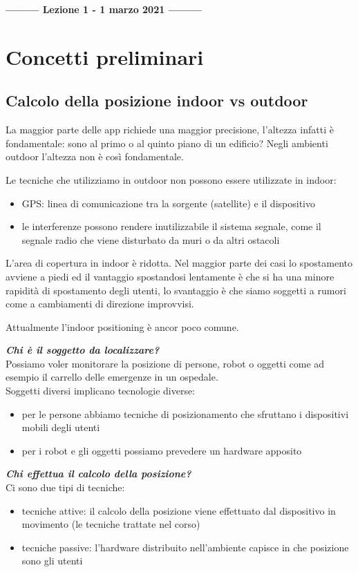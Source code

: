 \begin{center}
    \textbf{--------- Lezione 1 - 1 marzo 2021 ---------}
\end{center}

\section{Concetti preliminari}
\subsection{Calcolo della posizione indoor vs outdoor}
La maggior parte delle app richiede una maggior precisione, l'altezza infatti è fondamentale: sono al primo o al quinto piano di un edificio?
Negli ambienti outdoor l'altezza non è così fondamentale.

Le tecniche che utilizziamo in outdoor non possono essere utilizzate in indoor:
\begin{itemize}
    \item GPS: linea di comunicazione tra la sorgente (satellite) e il dispositivo
    \item le interferenze possono rendere inutilizzabile il sistema segnale, come il segnale radio che viene disturbato da muri o da altri ostacoli
\end{itemize}  

L'area di copertura in indoor è ridotta. 
Nel maggior parte dei casi lo spostamento avviene a piedi ed il vantaggio spostandosi lentamente è che si ha una minore rapidità di spostamento degli utenti, lo svantaggio è che siamo soggetti a rumori come a cambiamenti di direzione improvvisi. 

Attualmente l'indoor positioning è ancor poco comune.

\textit{\textbf{Chi è il soggetto da localizzare?}}
\\ Possiamo voler monitorare la posizione di persone, robot o oggetti come ad esempio il carrello delle emergenze in un ospedale. 
\\ Soggetti diversi implicano tecnologie diverse:
\begin{itemize}
    \item per le persone abbiamo tecniche di posizionamento che sfruttano i dispositivi mobili degli utenti
    \item per i robot e gli oggetti possiamo prevedere un hardware apposito
\end{itemize}

\textit{\textbf{Chi effettua il calcolo della posizione?}} 
\\ Ci sono due tipi di tecniche: 
\begin{itemize}
    \item tecniche attive: il calcolo della posizione viene effettuato dal dispositivo in movimento (le tecniche trattate nel corso)
    \item tecniche passive: l'hardware distribuito nell'ambiente capisce in che posizione sono gli utenti 
\end{itemize}

